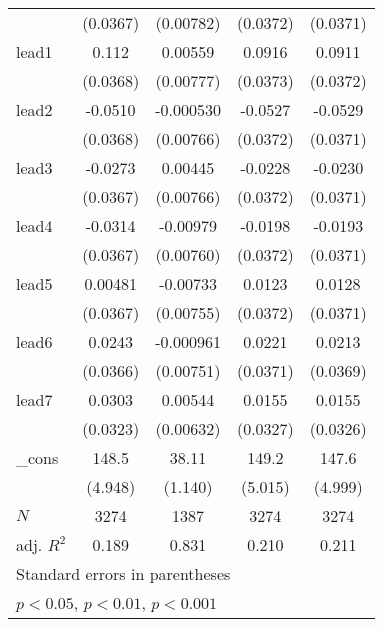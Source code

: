 {\begin{tabular}{l*{4}{c}}
            &    (0.0367)         &   (0.00782)         &    (0.0372)         &    (0.0371)         \\
[1em]
lead1       &       0.112\sym{**} &     0.00559         &      0.0916\sym{*}  &      0.0911\sym{*}  \\
            &    (0.0368)         &   (0.00777)         &    (0.0373)         &    (0.0372)         \\
[1em]
lead2       &     -0.0510         &   -0.000530         &     -0.0527         &     -0.0529         \\
            &    (0.0368)         &   (0.00766)         &    (0.0372)         &    (0.0371)         \\
[1em]
lead3       &     -0.0273         &     0.00445         &     -0.0228         &     -0.0230         \\
            &    (0.0367)         &   (0.00766)         &    (0.0372)         &    (0.0371)         \\
[1em]
lead4       &     -0.0314         &    -0.00979         &     -0.0198         &     -0.0193         \\
            &    (0.0367)         &   (0.00760)         &    (0.0372)         &    (0.0371)         \\
[1em]
lead5       &     0.00481         &    -0.00733         &      0.0123         &      0.0128         \\
            &    (0.0367)         &   (0.00755)         &    (0.0372)         &    (0.0371)         \\
[1em]
lead6       &      0.0243         &   -0.000961         &      0.0221         &      0.0213         \\
            &    (0.0366)         &   (0.00751)         &    (0.0371)         &    (0.0369)         \\
[1em]
lead7       &      0.0303         &     0.00544         &      0.0155         &      0.0155         \\
            &    (0.0323)         &   (0.00632)         &    (0.0327)         &    (0.0326)         \\
[1em]
\_cons      &       148.5\sym{***}&       38.11\sym{***}&       149.2\sym{***}&       147.6\sym{***}\\
            &     (4.948)         &     (1.140)         &     (5.015)         &     (4.999)         \\
\hline
\(N\)       &        3274         &        1387         &        3274         &        3274         \\
adj. \(R^{2}\)&       0.189         &       0.831         &       0.210         &       0.211         \\
\hline\hline
\multicolumn{5}{l}{\footnotesize Standard errors in parentheses}\\
\multicolumn{5}{l}{\footnotesize \sym{*} \(p<0.05\), \sym{**} \(p<0.01\), \sym{***} \(p<0.001\)}\\
\end{tabular}
}

